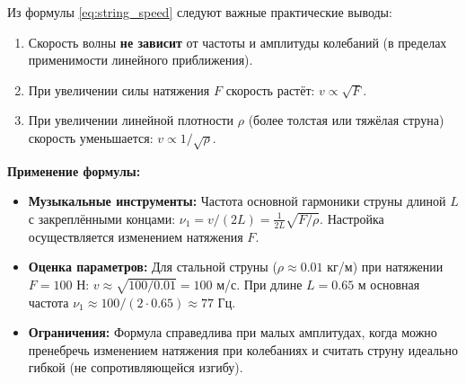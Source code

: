 \begin{property}
Из формулы \eqref{eq:string_speed} следуют важные практические выводы:
\begin{enumerate}
    \item Скорость волны \textbf{не зависит} от частоты и амплитуды колебаний (в пределах применимости линейного приближения).
    \item При увеличении силы натяжения $F$ скорость растёт: $v \propto \sqrt{F}$.
    \item При увеличении линейной плотности $\rho$ (более толстая или тяжёлая струна) скорость уменьшается: $v \propto 1/\sqrt{\rho}$.
\end{enumerate}
\end{property}

\begin{remark}
\textbf{Применение формулы:}
\begin{itemize}
    \item \textbf{Музыкальные инструменты:} Частота основной гармоники струны длиной $L$ с закреплёнными концами: $\nu_1 = v/(2L) = \frac{1}{2L}\sqrt{F/\rho}$. Настройка осуществляется изменением натяжения $F$.
    \item \textbf{Оценка параметров:} Для стальной струны ($\rho \approx 0.01$ кг/м) при натяжении $F = 100$ Н: $v \approx \sqrt{100/0.01} = 100$ м/с. При длине $L = 0.65$ м основная частота $\nu_1 \approx 100/(2 \cdot 0.65) \approx 77$ Гц.
    \item \textbf{Ограничения:} Формула справедлива при малых амплитудах, когда можно пренебречь изменением натяжения при колебаниях и считать струну идеально гибкой (не сопротивляющейся изгибу).
\end{itemize}
\end{remark}
